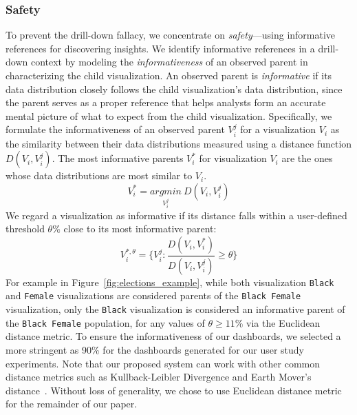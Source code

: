 \subsubsection{Safety}
To prevent the drill-down fallacy, we concentrate on \emph{safety}---using informative references for discovering insights. We identify informative references in a drill-down context by modeling the \emph{informativeness} of an observed parent in characterizing the child visualization. An observed parent is \emph{informative} if its data distribution closely follows the child visualization's data distribution, since the parent serves as a proper reference that helps analysts form an accurate mental picture of what to expect from the child visualization. Specifically, we formulate the informativeness of an observed parent $V_i^j$ for a visualization $V_i$ as the similarity between their data distributions measured using a distance function $D(V_i, V_i^j)$. The most informative parents $V_i^*$ for visualization $V_i$ are the ones whose data distributions are most similar to $V_i$.
\begin{equation}
    V_i^*=\underset{V_i^j}{argmin}\ D(V_i, V_i^j)
\end{equation}
We regard a visualization as informative if its distance falls within a user-defined threshold $\theta\%$ close to its most informative parent:
\begin{equation}
    V_i^{*, \theta} = \{V_i^j : \frac{D(V_i, V_i^*)}{D(V_i, V_i^j)} \geq \theta\}
\end{equation}
For example in Figure~\ref{fig:elections_example}, while both visualization \texttt{Black} and \texttt{Female} visualizations are considered parents of the \texttt{Black Female} visualization, only the \texttt{Black} visualization is considered an informative parent of the \texttt{Black Female} population, for any values of $\theta \geq 11\%$ via the Euclidean distance metric. To ensure the informativeness of our dashboards, we selected a more stringent \theta as 90\%  for the dashboards generated for our user study experiments. Note that our proposed system can work with other common distance metrics such as Kullback-Leibler Divergence and Earth Mover's distance~\cite{Vartak2015}. Without loss of generality, we chose to use Euclidean distance metric for the remainder of our paper.
